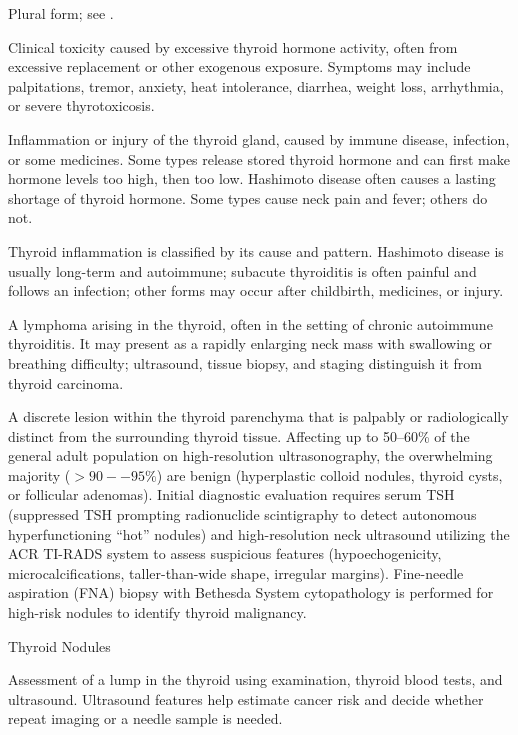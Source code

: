  Plural form; see .

 Clinical toxicity caused by excessive thyroid hormone activity, often from excessive replacement or other exogenous exposure. Symptoms may include palpitations, tremor, anxiety, heat intolerance, diarrhea, weight loss, arrhythmia, or severe thyrotoxicosis.

 Inflammation or injury of the thyroid gland, caused by immune disease, infection, or some medicines. Some types release stored thyroid hormone and can first make hormone levels too high, then too low. Hashimoto disease often causes a lasting shortage of thyroid hormone. Some types cause neck pain and fever; others do not.

 Thyroid inflammation is classified by its cause and pattern. Hashimoto disease is usually long-term and autoimmune; subacute thyroiditis is often painful and follows an infection; other forms may occur after childbirth, medicines, or injury.

 A lymphoma arising in the thyroid, often in the setting of chronic autoimmune thyroiditis. It may present as a rapidly enlarging neck mass with swallowing or breathing difficulty; ultrasound, tissue biopsy, and staging distinguish it from thyroid carcinoma.

 A discrete lesion within the thyroid parenchyma that is palpably or radiologically distinct from the surrounding thyroid tissue. Affecting up to 50--60\% of the general adult population on high-resolution ultrasonography, the overwhelming majority ($>90--95\%$) are benign (hyperplastic colloid nodules, thyroid cysts, or follicular adenomas). Initial diagnostic evaluation requires serum TSH (suppressed TSH prompting radionuclide scintigraphy to detect autonomous hyperfunctioning ``hot'' nodules) and high-resolution neck ultrasound utilizing the ACR TI-RADS system to assess suspicious features (hypoechogenicity, microcalcifications, taller-than-wide shape, irregular margins). Fine-needle aspiration (FNA) biopsy with Bethesda System cytopathology is performed for high-risk nodules to identify thyroid malignancy.

\synonyms
Thyroid Nodules

 Assessment of a lump in the thyroid using examination, thyroid blood tests, and ultrasound. Ultrasound features help estimate cancer risk and decide whether repeat imaging or a needle sample is needed.

